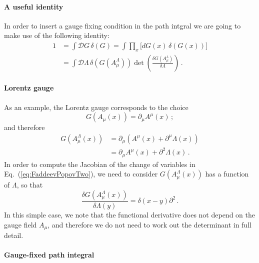 \documentclass[notes]{subfiles}
\begin{document}
\paragraph{A useful identity}

In order to insert a gauge fixing condition in the path intgral we are
going to make use of the following identity:
\begin{align} 
  \label{eq:FaddeevPopovOne}
  1 &= \int \mathcal{D}G\, \delta(G) = 
      \int \prod_x \Big[ dG(x)\, \delta\left(G(x)\right) \Big]\\
  \label{eq:FaddeevPopovTwo}
    &= \int \mathcal{D}\Lambda\, \delta\left(G\left(
      A^\Lambda_\mu\right)\right)
      \det \left(
      \frac{\delta G\left(A^\lambda_\mu\right)}{\delta \Lambda}
      \right)\, .
\end{align}

\paragraph{Lorentz gauge}

As an example, the Lorentz gauge corresponds to the choice
\begin{equation}
  \label{eq:LorentzGauge}
  G\left(A_\mu(x)\right) = \partial_\mu A^\mu(x)\, ; 
\end{equation}
and therefore
\begin{align}
  G\left(A^\Lambda_\mu(x)\right)
  &= \partial_\mu\left(A^\mu(x) + \partial^\mu\Lambda(x)\right) \\
  &= \partial_\mu A^\mu(x) + \partial^2 \Lambda(x)\, .
\end{align}
In order to compute the Jacobian of the change of variables in
Eq.~(\ref{eq:FaddeevPopovTwo}), we need to consider
$G\left(A^\Lambda_\mu(x)\right)$ has a function of $\Lambda$, so that
\begin{equation}
  \label{eq:GaugeFixDeriv}
  \frac{\delta G\left(A^\Lambda_\mu(x)\right)}{\delta \Lambda(y)} = 
  \delta(x-y) \partial^2\, .
\end{equation}
In this simple case, we note that the functional derivative does not
depend on the gauge field $A_\mu$, and therefore we do not need to
work out the determinant in full detail. 

\paragraph{Gauge-fixed path integral}
\end{document}
